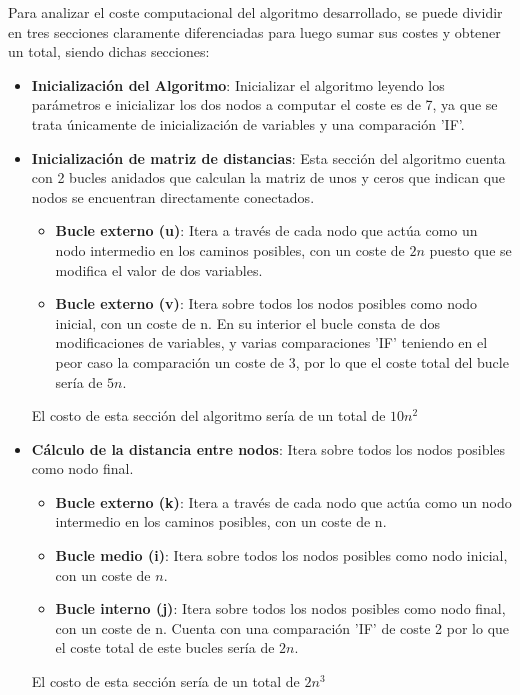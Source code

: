 Para analizar el coste computacional del algoritmo desarrollado, se puede dividir en tres secciones claramente diferenciadas para luego sumar sus costes y obtener un total, siendo dichas secciones: 
\begin{itemize}
    \item \textbf{Inicialización del Algoritmo}: Inicializar el algoritmo leyendo los parámetros e inicializar los dos nodos a computar el coste es de 7, ya que se trata únicamente de inicialización de variables y una comparación 'IF'.
    
    \item \textbf{Inicialización de matriz de distancias}: Esta sección del algoritmo cuenta con 2 bucles anidados que calculan la matriz de unos y ceros que indican que nodos se encuentran directamente conectados.
    \begin{itemize}
        \item \textbf{Bucle externo (u)}: Itera a través de cada nodo que actúa como un nodo intermedio en los caminos posibles, con un coste de $2n$ puesto que se modifica el valor de dos variables.
        \item \textbf{Bucle externo (v)}: Itera sobre todos los nodos posibles como nodo inicial, con un coste de n. En su interior el bucle consta de dos modificaciones de variables, y varias comparaciones 'IF' teniendo en el peor caso la comparación un coste de 3, por lo que el coste total del bucle sería de $5n$.
    \end{itemize}
    El costo de esta sección del algoritmo sería de un total de $10n^2$

    \item \textbf{Cálculo de la distancia entre nodos}: Itera sobre todos los nodos posibles como nodo final.
    \begin{itemize}
        \item \textbf{Bucle externo (k)}: Itera a través de cada nodo que actúa como un nodo intermedio en los caminos posibles, con un coste de n.
        \item \textbf{Bucle medio (i)}: Itera sobre todos los nodos posibles como nodo inicial, con un coste de $n$.
        \item \textbf{Bucle interno (j)}: Itera sobre todos los nodos posibles como nodo final, con un coste de n. Cuenta con una comparación 'IF' de coste 2 por lo que el coste total de este bucles sería de $2n$.
    \end{itemize}
    El costo de esta sección sería de un total de $2n^3$
    
\end{itemize}

